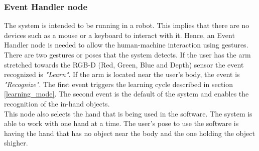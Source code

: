 
\subsubsection{Event Handler node}
\label{event_handler}
	The system is intended to be running in a robot. 
	This implies that there are no devices such as a mouse or a keyboard to interact with it. 
	Hence, an Event Handler node is needed to allow the human-machine interaction using gestures. 
	There are two gestures or poses that the system detects. 
	If the user has the arm stretched towards the RGB-D (Red, Green, Blue and Depth) sensor the event recognized is \textit{"Learn"}. 
	If the arm is located near the user's body, the event is \textit{"Recognize"}. 
	The first event triggers the learning cycle described in section \ref{learning_mode}. 
	The second event is the default of the system and enables the recognition of the in-hand objects. 
	\\

	This node also selects the hand that is being used in the software. 
	The system is able to work with one hand at a time. 
	The user's pose to use the software is having the hand that has no object near the body and the one holding the object shigher. 
	\\

